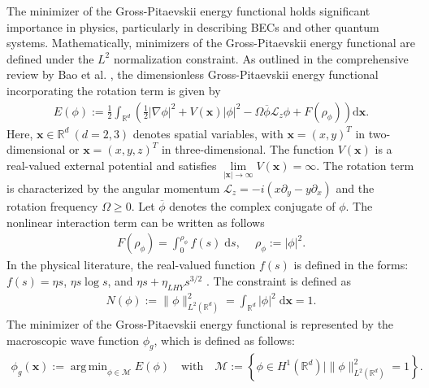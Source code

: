 \documentclass[preprint,3p]{elsarticle}
\DeclareMathOperator*{\argmin}{arg\,min}
\begin{document}
The minimizer of the Gross-Pitaevskii energy functional holds significant importance in physics, particularly in describing BECs and other quantum systems.
Mathematically, minimizers of the Gross-Pitaevskii energy functional are defined under the $L^2$ normalization constraint. As outlined in the comprehensive review by Bao et al. \cite{2013Mathematical}, the dimensionless Gross-Pitaevskii energy functional incorporating the rotation term is given by
\begin{align}\label{GP-Energy}
	E(\phi):=\frac{1}{2}\int_{\mathbb{R}^d}\left(\frac{1}{2}|\nabla\phi|^2+V(\bm{x})|\phi|^2
	-\Omega\overline{\phi} \mathcal{L}_z\phi+F(\rho_{\phi})\right)\text{d}\bm{x}.
\end{align}
Here, $\bm{x}\in\mathbb{R}^d\ (d=2,3)$ denotes spatial variables, with $\bm{x}=(x, y)^T$ in two-dimensional or $\bm{x}=(x, y, z)^T$ in three-dimensional. {The function} $V(\bm{x})$ is a real-valued external potential and satisfies $\lim\limits_{|\bm{x}|\to\infty}V(\bm{x})=\infty$. The rotation term is characterized by the angular momentum $\mathcal{L}_z=-i(x\partial_y-y\partial_x)$ and the rotation frequency $\Omega\ge0$. {Let} $\overline{\phi}$ denotes the complex conjugate of $\phi$. The nonlinear interaction term can be written as follows
\begin{align*}
	F(\rho_{\phi})=\int_{0}^{\rho_{\phi}}f(s)\;\text{d}s,\quad\ \rho_{\phi}:=|\phi|^2.
\end{align*}
In the physical literature, the real-valued function $f(s)$ is defined in the forms: $f(s)=\eta s$, $\eta s\log s$, and $\eta s+\eta_{LHY} s^{3/2}$ \cite{2021Rota,2006Deri,2020Supp,2019Rota}. 
The constraint is defined as
\begin{align*}
	N(\phi):=\|\phi\|_{L^2(\mathbb{R}^d)}^2=\int_{\mathbb{R}^d}|\phi|^2\;\text{d}\bm{x}=1.
\end{align*}
The minimizer of the Gross-Pitaevskii energy functional is represented by the macroscopic wave function $\phi_g$, which is defined as follows:
\begin{align}\label{O-P}
	\phi_g(\bm{x}):=\argmin_{\phi\in\mathcal{M}} E(\phi)\quad
	\mbox{with} \quad  \mathcal{M}:=\left\{\phi\in H^1(\mathbb{R}^d)\big|\|\phi\|_{L^2(\mathbb{R}^d)}^2=1\right\}.
\end{align}
\end{document}
